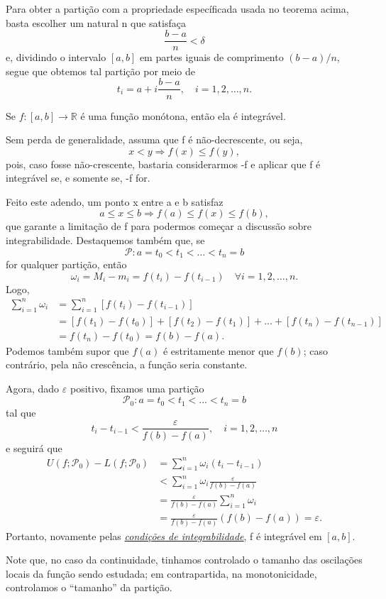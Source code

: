 \documentclass[../analysisII_notes.tex]{subfiles}
\begin{document}
\begin{tcolorbox}[
		skin=enhanced,
		title=Observação,
		fonttitle=\bfseries,
		colframe=black,
		colbacktitle=cyan!75!white,
		colback=cyan!15,
		colbacklower=black,
		coltitle=black,
		drop fuzzy shadow,
	]
	Para obter a partição com a propriedade específicada usada no teorema acima, basta escolher um natural n que satisfaça
	\[
		\frac{b-a}{n}<\delta
	\]
	e, dividindo o intervalo \([a, b]\) em partes iguais de comprimento \((b-a)/n\), segue que obtemos tal partição por meio de
	\[
		t_{i}=a + i \frac{b-a}{n},\quad i=1, 2,\dotsc ,n.
	\]
\end{tcolorbox}
\begin{theorem*}
	Se \(f:[a, b]\rightarrow \mathbb{R}\) é uma função monótona, então ela é integrável.
\end{theorem*}
\begin{proof*}
	Sem perda de generalidade, assuma que f é não-decrescente, ou seja,
	\[
		x<y \Rightarrow f(x)\leq f(y),
	\]
	pois, caso fosse não-crescente, bastaria considerarmos -f e aplicar que f é integrável se, e somente se, -f for.

	Feito este adendo, um ponto x entre a e b satisfaz
	\[
		a \leq x \leq b \Rightarrow f(a)\leq f(x)\leq f(b),
	\]
	que garante a limitação de f para podermos começar a discussão sobre integrabilidade. Destaquemos também que, se
	\[
		\mathcal{P}: a = t_{0} < t_{1} < \dotsc < t_{n}=b
	\]
	for qualquer partição, então
	\[
		\omega_{i}=M_{i}-m_{i} = f(t_{i})-f(t_{i-1}) \quad \forall i=1,2,\dotsc ,n.
	\]
	Logo,
	\begin{align*}
		\sum\limits_{i=1}^{n}\omega_{i} & = \sum\limits_{i=1}^{n}[f(t_{i})-f(t_{i-1})]                                   \\
		                                & = [f(t_{1}) - f(t_{0})] + [f(t_{2})-f(t_{1})] + \dotsc + [f(t_{n})-f(t_{n-1})] \\
		                                & = f(t_{n})-f(t_{0}) = f(b)-f(a).
	\end{align*}
	Podemos também supor que \(f(a)\) é estritamente menor que \(f(b)\); caso contrário, pela não crescência, a função seria constante.

	Agora, dado \(\varepsilon \) positivo, fixamos uma partição
	\[
		\mathcal{P}_{0}: a = t_{0} < t_{1} < \dotsc < t_{n}=b
	\]
	tal que
	\[
		t_{i}-t_{i-1}<\frac{\varepsilon }{f(b)-f(a)},\quad i=1,2,\dotsc ,n
	\]
	e seguirá que
	\begin{align*}
		U(f; \mathcal{P}_{0})-L(f; \mathcal{P}_{0}) & = \sum\limits_{i=1}^{n}\omega_{i}(t_{i}-t_{i-1})                 \\
		                                            & < \sum\limits_{i=1}^{n}\omega_{i} \frac{\varepsilon }{f(b)-f(a)} \\
		                                            & = \frac{\varepsilon }{f(b)-f(a)}\sum\limits_{i=1}^{n}\omega_{i}  \\
		                                            & = \frac{\varepsilon }{f(b)-f(a)}(f(b)-f(a))= \varepsilon .
	\end{align*}
	Portanto, novamente pelas \hyperlink{integrability_conditions}{\textit{condições de integrabilidade}}, f é integrável em \([a, b]\). \qedsymbol
\end{proof*}
Note que, no caso da continuidade, tinhamos controlado o tamanho das oscilações locais da função sendo estudada; em contrapartida, na monotonicidade, controlamos o ``tamanho'' da partição.
\end{document}
